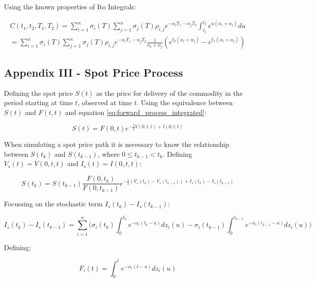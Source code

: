 \documentclass{article}
\begin{document}
Using the known properties of Ito Integrals:

\begin{eqnarray}
    \nonumber
    C(t_1, t_2, T_1, T_2) = \sum_{i=1}^n \sigma_i(T) \sum_{j=1}^n 
    \sigma_j(T) \rho_{i,j} e^{-\alpha_i T_1 -\alpha_j T_2} 
    \int_{t_1}^{t_2} e^{u(\alpha_i + \alpha_j)} du \\
    = \sum_{i=1}^n \sigma_i(T) \sum_{j=1}^n \sigma_j(T) \rho_{i,j} 
    e^{-\alpha_i T_1 -\alpha_j T_2} \frac{1}{\alpha_i + \alpha_j}
    (e^{t_2(\alpha_i + \alpha_j)} - e^{t_1(\alpha_i + \alpha_j)} )
\end{eqnarray}

\subsection{Appendix III - Spot Price Process}
Defining the spot price $S(t)$ as the price for delivery of the commodity in the period
starting at time $t$, observed at time $t$. Using the equivalence between $S(t)$
and $F(t, t)$ and equation \ref{eq:forward_process_integrated}:

\begin{equation}
    S(t) = F(0, t)e^{- \frac{1}{2} V(0, t, t) + I(0, t, t)}
\end{equation}

When simulating a spot price path it is necessary to know the relationship between
$S(t_k)$ and $S(t_{k-1})$, where $0 \leq t_{k-1} < t_k$. Defining $V_s(t)=V(0, t, t)$ and 
$I_s(t)=I(0, t, t)$:

\begin{equation}
    S(t_k) = S(t_{k-1}) \frac{F(0, t_k)}{F(0, t_{k-1})} e^{- \frac{1}{2} (V_s(t_k) - 
    V_s(t_{k-1})) + I_s(t_k) - I_s(t_{k-1})}
\end{equation}

Focussing on the stochastic term $I_s(t_k) - I_s(t_{k-1})$:

\begin{equation}
    I_s(t_k) - I_s(t_{k-1}) = \sum_{i=1}^n \biggl( \sigma_i(t_k) 
    \int_0^{t_k} e^{-\alpha_i(t_k-u)} dz_i(u) - \sigma_i(t_{k-1}) 
    \int_0^{t_{k-1}} e^{-\alpha_i(t_{k-1}-u)} dz_i(u) \biggr)
\end{equation}

Defining:

\begin{equation}
    F_i(t) = \int_0^{t} e^{-\alpha_i(t-u)} dz_i(u)
\end{equation}
\end{document}
